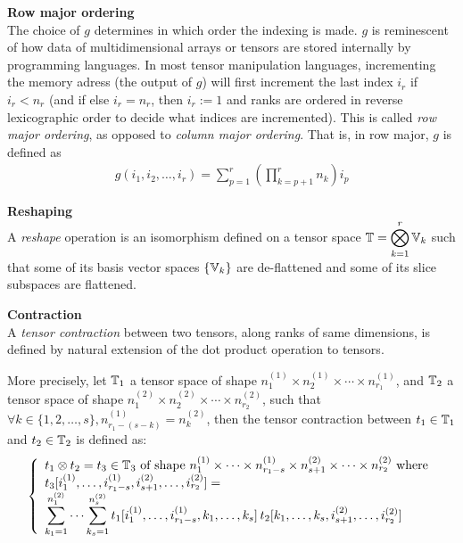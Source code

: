 \begin{remark}\textbf{Row major ordering}\\
The choice of $g$ determines in which order the indexing is made. $g$ is reminescent of how data of multidimensional arrays or tensors are stored internally by programming languages. In most tensor manipulation languages, incrementing the memory adress (\ie the output of $g$) will first increment the last index $i_r$ if $i_r < n_r$ (and if else $i_r = n_r$, then $i_r := 1$ and ranks are ordered in reverse lexicographic order to decide what indices are incremented). This is called \emph{row major ordering}, as opposed to \emph{column major ordering}. That is, in row major, $g$ is defined as
\begin{align}
  g(i_1, i_2, \ldots, i_r) = \displaystyle \sum_{p=1}^r \left( \prod_{k=p+1}^r n_k \right) i_p \label{rowmajor}
\end{align}
\end{remark}

\begin{definition}\textbf{Reshaping}\\
A \emph{reshape} operation is an isomorphism defined on a tensor space $\mathbb{T} = \displaystyle \bigotimes_{k=1}^r \mathbb{V}_k$ such that some of its basis vector spaces $\{\mathbb{V}_k\}$ are de-flattened and some of its slice subspaces are flattened.
\end{definition}

\begin{definition}\textbf{Contraction}\\
A \emph{tensor contraction} between two tensors, along ranks of same dimensions, is defined by natural extension of the dot product operation to tensors.

More precisely, let $\mathbb{T}_1$ a tensor space of shape $n_1^{(1)} \times n_2^{(1)} \times \cdots \times n_{r_1}^{(1)}$, and $\mathbb{T}_2$ a tensor space of shape $n_1^{(2)} \times n_2^{(2)} \times \cdots \times n_{r_2}^{(2)}$, such that $\forall k \in \{1, 2, \ldots, s\}, n_{r_1-(s-k)}^{(1)} = n_k^{(2)}$, then the tensor contraction between $t_1 \in \mathbb{T}_1$ and $t_2 \in \mathbb{T}_2$ is defined as:
\begin{gather*}
\left\{
  \begin{array}{l}
    t_1 \otimes t_2 = t_3 \in \mathbb{T}_3 \text{ of shape } n_1^{(1)} \times \cdots \times n_{r_1-s}^{(1)} \times n_{s+1}^{(2)} \times \cdots \times n_{r_2}^{(2)}
    \text{ where} \\
    t_3[i_1^{(1)}, \ldots, i_{r_1-s}^{(1)}, i_{s+1}^{(2)}, \ldots, i_{r_2}^{(2)}] = \\
    \displaystyle \sum_{k_1=1}^{n_1^{(2)}} \cdots \sum_{k_s=1}^{n_s^{(2)}}
    t_1[i_1^{(1)}, \ldots, i_{r_1-s}^{(1)}, k_1, \ldots, k_s] \hspace{2pt}
    t_2[k_1, \ldots, k_s, i_{s+1}^{(2)}, \ldots, i_{r_2}^{(2)}]
  \end{array}
\right.
\end{gather*}
\end{definition}

